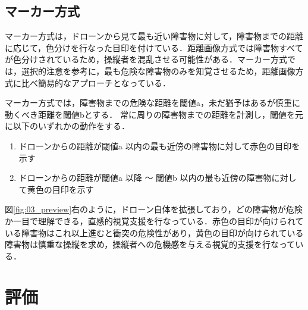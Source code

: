 \documentclass[submit]{ipsj}
\begin{document}
\subsection{マーカー方式}
マーカー方式は，ドローンから見て最も近い障害物に対して，障害物までの距離に応じて，色分けを行なった目印を付けている．距離画像方式では障害物すべてが色分けされているため，操縦者を混乱させる可能性がある．マーカー方式では，選択的注意を参考に，最も危険な障害物のみを知覚させるため，距離画像方式に比べ簡易的なアプローチとなっている．
\par
マーカー方式では，障害物までの危険な距離を閾値a，未だ猶予はあるが慎重に動くべき距離を閾値bとする．
常に周りの障害物までの距離を計測し，閾値を元に以下のいずれかの動作をする．

\begin{enumerate}
	\item ドローンからの距離が閾値a 以内の最も近傍の障害物に対して赤色の目印を示す
    
    \item ドローンからの距離が閾値a 以降 〜 閾値b 以内の最も近傍の障害物に対して黄色の目印を示す
\end{enumerate}

図\ref{fig:03_preview}右のように，ドローン自体を拡張しており，どの障害物が危険か一目で理解できる，直感的視覚支援を行なっている．赤色の目印が向けられている障害物はこれ以上進むと衝突の危険性があり，黄色の目印が向けられている障害物は慎重な操縦を求め，操縦者への危機感を与える視覚的支援を行なっている．

\section{評価}
\end{document}
